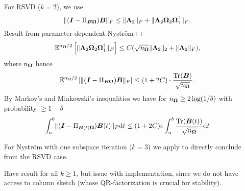 For RSVD ($k=2$), we use \cite[theorem~9.1]{halko2011finding}
\begin{equation}
    \lVert (\boldsymbol{I} - \Pi_{\boldsymbol{B}\boldsymbol{\Omega}}) \boldsymbol{B} \rVert _F \leq \lVert \boldsymbol{\Lambda}_2 \rVert _F + \lVert \boldsymbol{\Lambda}_2 \boldsymbol{\Omega}_2 \boldsymbol{\Omega}_1^{\dagger} \rVert _F.
\end{equation}
Result from parameter-dependent Nyström++ 
\begin{equation}
    \mathbb{E}^{n_{\mtx{\Omega}}/2} \left[ \lVert \mtx{\Lambda}_2 \mtx{\Omega}_2 \mtx{\Omega}_1^{\dagger} \rVert _F \right] \leq C(\sqrt{n_{\mtx{\Omega}}} \lVert \mtx{\Lambda}_2 \rVert _2 + \lVert \mtx{\Lambda}_2 \rVert _F),%
\end{equation}
where $n_{\boldsymbol{\Omega}}$ hence
\begin{equation}
    \mathbb{E}^{n_{\boldsymbol{\Omega}}/2} \left[ \lVert (\boldsymbol{I} - \Pi_{\boldsymbol{B}\boldsymbol{\Omega}}) \boldsymbol{B} \rVert _F \right]
    \leq (1 + 2C) \cdot \frac{\operatorname{Tr}(\boldsymbol{B})}{\sqrt{n_{\boldsymbol{\Omega}}}}.
\end{equation}
By Markov's and Minkowski's inequalities we have for $n_{\boldsymbol{\Omega}} \geq 2 \log(1/\delta)$ with probability $\geq 1 - \delta$
\begin{equation}
    \int_{a}^{b}\lVert  (\boldsymbol{I} - \Pi_{\boldsymbol{B}(t)\boldsymbol{\Omega}}) \boldsymbol{B}(t) \rVert _F \mathrm{d}t \leq (1 + 2C) e \int_{a}^{b}\frac{\operatorname{Tr}(\boldsymbol{B}(t))}{\sqrt{n_{\boldsymbol{\Omega}}}} \mathrm{d}t
\end{equation}

For Nystr\"om with one subspace iteration ($k=3$) we apply \cite[lemma~5.2]{tropp2023randomized}
to directly conclude from the RSVD case.

Have result for all $k \geq 1$, but issue with implementation, since we do not
have access to column sketch (whose QR-factorization is crucial for stability).

